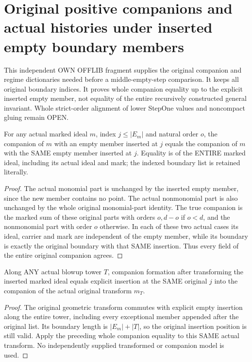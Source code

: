 \section{Original positive companions and actual histories under inserted empty boundary members}
This independent OWN OFFLIB fragment supplies the original companion and regime dictionaries needed before a middle-empty-step comparison. It keeps all original boundary indices. It proves whole companion equality up to the explicit inserted empty member, not equality of the entire recursively constructed general invariant. Whole strict-order alignment of lower StepOne values and noncompact gluing remain OPEN.

\begin{lemma}
\label{hir:original-positive-companion-empty-insertion}
\leanok
For any actual marked ideal $m$, index $j\le |E_m|$ and natural order $o$, the companion of $m$ with an empty member inserted at $j$ equals the companion of $m$ with the SAME empty member inserted at $j$. Equality is of the ENTIRE marked ideal, including its actual ideal and mark; the indexed boundary list is retained literally.
\end{lemma}
\begin{proof}
The actual monomial part is unchanged by the inserted empty member, since the new member contains no point. The actual nonmonomial part is also unchanged by the whole original monomial-part identity. The true companion is the marked sum of these original parts with orders $o,d-o$ if $o<d$, and the nonmonomial part with order $o$ otherwise. In each of these two actual cases its ideal, carrier and mark are independent of the empty member, while its boundary is exactly the original boundary with that SAME insertion. Thus every field of the entire original companion agrees.
\end{proof}

\begin{lemma}
\label{hir:original-positive-companion-empty-stage}
\leanok
Along ANY actual blowup tower $T$, companion formation after transforming the inserted marked ideal equals explicit insertion at the SAME original $j$ into the companion of the actual original transform $m_T$.
\end{lemma}
\begin{proof}
The original geometric transform commutes with explicit empty insertion along the entire tower, including every exceptional member appended after the original list. Its boundary length is $|E_m|+|T|$, so the original insertion position is still valid. Apply the preceding whole companion equality to this SAME actual transform. No independently supplied transformed or companion model is used.
\end{proof}

